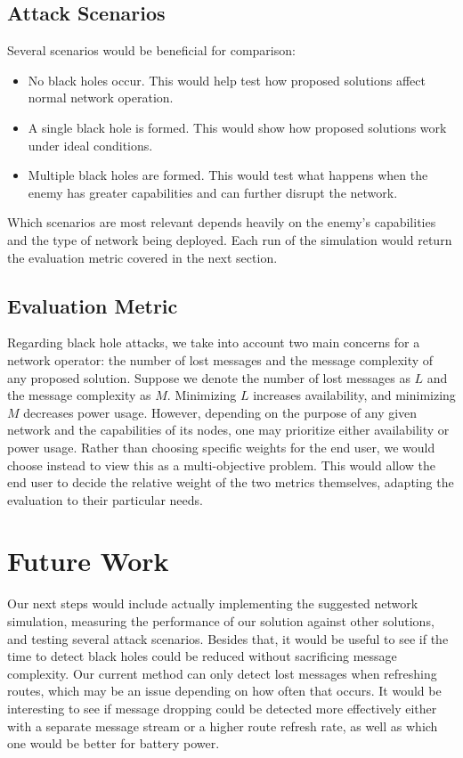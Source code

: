 \documentclass[12pt,a4paper]{report}
\begin{document}
\subsection{Attack Scenarios}
Several scenarios would be beneficial for comparison:
\begin{itemize}
    \item No black holes occur. This would help test how proposed solutions affect normal network operation.
    \item A single black hole is formed. This would show how proposed solutions work under ideal conditions.
    \item Multiple black holes are formed. This would test what happens when the enemy has greater capabilities and can further disrupt the network.
\end{itemize}
Which scenarios are most relevant depends heavily on the enemy's capabilities and the type of network being deployed. Each run of the simulation would return the evaluation metric covered in the next section.

\subsection{Evaluation Metric}
Regarding black hole attacks, we take into account two main concerns for a network operator: the number of lost messages and the message complexity of any proposed solution. Suppose we denote the number of lost messages as $L$ and the message complexity as $M$. Minimizing $L$ increases availability, and minimizing $M$ decreases power usage. However, depending on the purpose of any given network and the capabilities of its nodes, one may prioritize either availability or power usage. Rather than choosing specific weights for the end user, we would choose instead to view this as a multi-objective problem. This would allow the end user to decide the relative weight of the two metrics themselves, adapting the evaluation to their particular needs.

\pagebreak
\section{Future Work}
Our next steps would include actually implementing the suggested network simulation, measuring the performance of our solution against other solutions, and testing several attack scenarios. Besides that, it would be useful to see if the time to detect black holes could be reduced without sacrificing message complexity. Our current method can only detect lost messages when refreshing routes, which may be an issue depending on how often that occurs. It would be interesting to see if message dropping could be detected more effectively either with a separate message stream or a higher route refresh rate, as well as which one would be better for battery power.



\end{document}
